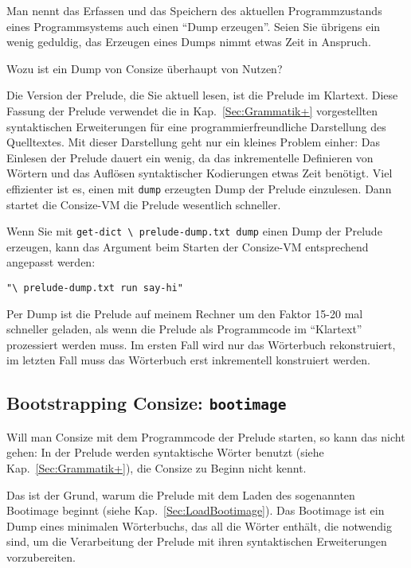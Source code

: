 Man nennt das Erfassen und das Speichern des aktuellen Programmzustands eines Programmsystems auch einen "`Dump erzeugen"'. Seien Sie übrigens ein wenig geduldig, das Erzeugen eines Dumps nimmt etwas Zeit in Anspruch.

Wozu ist ein Dump von Consize überhaupt von Nutzen?

Die Version der Prelude, die Sie aktuell lesen, ist die Prelude im Klartext. Diese Fassung der Prelude verwendet die in Kap.~\ref{Sec:Grammatik+} vorgestellten syntaktischen Erweiterungen für eine programmierfreundliche Darstellung des Quelltextes. Mit dieser Darstellung geht nur ein kleines Problem einher: Das Einlesen der Prelude dauert ein wenig, da das inkrementelle Definieren von Wörtern und das Auflösen syntaktischer Kodierungen etwas Zeit benötigt. Viel effizienter ist es, einen mit \verb|dump| erzeugten Dump der Prelude einzulesen. Dann startet die Consize-VM die Prelude wesentlich schneller.

Wenn Sie mit \verb|get-dict \ prelude-dump.txt dump| einen Dump der Prelude erzeugen, kann das Argument beim Starten der Consize-VM entsprechend angepasst werden:

\begin{verbatim}
"\ prelude-dump.txt run say-hi"
\end{verbatim}

Per Dump ist die Prelude auf meinem Rechner um den Faktor 15-20 mal schneller geladen, als wenn die Prelude als Programmcode im "`Klartext"' prozessiert werden muss. Im ersten Fall wird nur das Wörterbuch rekonstruiert, im letzten Fall muss das Wörterbuch erst inkrementell konstruiert werden.

\subsection{Bootstrapping Consize: \texttt{bootimage}}
\label{Sec:Bootstrapping}

Will man Consize mit dem Programmcode der Prelude starten, so kann das nicht gehen: In der Prelude werden syntaktische Wörter benutzt (siehe Kap.~\ref{Sec:Grammatik+}), die Consize zu Beginn nicht kennt.

Das ist der Grund, warum die Prelude mit dem Laden des sogenannten Bootimage beginnt (siehe Kap.~\ref{Sec:LoadBootimage}). Das Bootimage ist ein Dump eines minimalen Wörterbuchs, das all die Wörter enthält, die notwendig sind, um die Verarbeitung der Prelude mit ihren syntaktischen Erweiterungen vorzubereiten.

